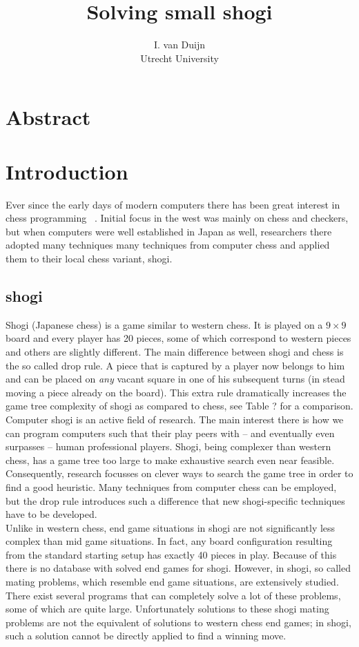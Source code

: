 \documentclass{article}
\title{Solving small shogi}
\author{I. van Duijn \\ Utrecht University}
\begin{document}
\maketitle

\section{Abstract}

\section{Introduction}
Ever since the early days of modern computers there has been great interest in chess programming ~\cite{shannon1950xxii}. Initial
focus in the west was mainly on chess and checkers, but when computers were well established in Japan as well, researchers there adopted
many techniques many techniques from computer chess and applied them to their local chess variant, shogi.

\subsection{shogi}%
Shogi (Japanese chess) is a game similar to western chess. It is played on a $9 \times 9$ board and every
player has 20 pieces, some of which correspond to western pieces and others are slightly different.
The main difference between shogi and chess is the so called drop rule.
A piece that is captured by a player now belongs to him and can be placed on \textit{any} vacant square in one of his subsequent turns
(in stead moving a piece already on the board).
This extra rule dramatically increases the game tree complexity of shogi as compared to chess, see Table ? for a comparison.\\

Computer shogi is an active field of research. The main interest there is how we can program computers 
such that their play peers with -- and eventually even surpasses -- human professional players. Shogi, being complexer
than western chess, has a game tree too large to make exhaustive search even near feasible. Consequently, research
focusses on clever ways to search the game tree in order to find a good heuristic. Many techniques from computer chess
can be employed, but the drop rule introduces such a difference that new shogi-specific techniques have to be developed.\\

Unlike in western chess, end game situations
in shogi are not significantly less complex than mid game situations. In fact, any board configuration resulting from the standard
starting setup has exactly 40 pieces in play. Because of this there is no database with solved end games for shogi.
However, in shogi, so called mating problems, which resemble end game situations, are extensively studied. There exist several
programs that can completely solve a lot of these problems, some of which are quite large. Unfortunately solutions to these shogi mating problems
are not the equivalent of solutions to western chess end games; in shogi, such a solution cannot be directly applied to find a winning move.
\end{document}
